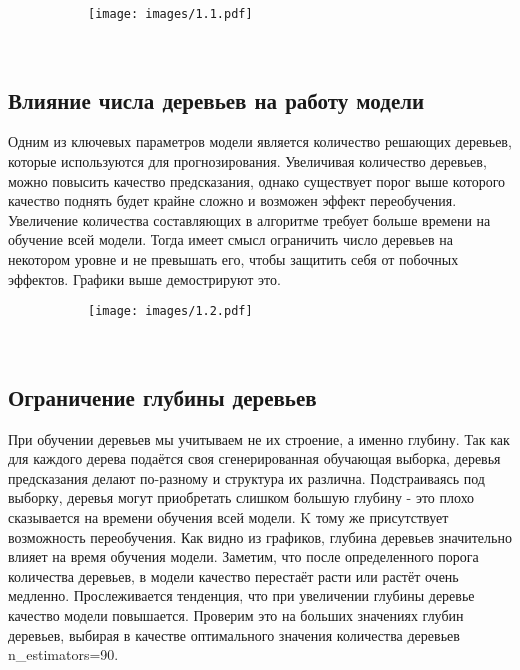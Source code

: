 \documentclass[a4paper,14pt]{article}
\begin{document}
\begin{figure}[h!]
                \centering
                \begin{subfigure}[b]{1.0\textwidth}
                    \texttt{[image: images/1.1.pdf]}
                \end{subfigure}
            \end{figure} \\

\subsection{Влияние числа деревьев на работу модели}
Одним из ключевых параметров модели является количество решающих деревьев, которые используются для прогнозирования. Увеличивая количество деревьев, можно повысить качество предсказания, однако существует порог выше которого качество поднять будет крайне сложно и возможен эффект переобучения. Увеличение количества составляющих в алгоритме требует больше времени на обучение всей модели. Тогда имеет смысл ограничить число деревьев на некотором уровне и не превышать его, чтобы защитить себя от побочных эффектов. Графики выше демострируют это.\\

\begin{figure}[h!]
                \centering
                \begin{subfigure}[b]{1.0\textwidth}
                    \texttt{[image: images/1.2.pdf]}
                \end{subfigure}
            \end{figure} \\
            
\subsection{Ограничение глубины деревьев}
При обучении деревьев мы учитываем не их строение, а именно глубину. Так как для каждого дерева подаётся своя сгенерированная обучающая выборка, деревья предсказания делают по-разному и структура их различна. Подстраиваясь под выборку, деревья могут приобретать слишком большую глубину - это плохо сказывается на времени обучения всей модели. K тому же присутствует возможность переобучения. 
Как видно из графиков, глубина деревьев значительно влияет на время обучения модели. Заметим, что после определенного порога количества деревьев, в модели качество перестаёт расти или растёт очень медленно. 
Прослеживается тенденция, что при увеличении глубины деревье качество модели повышается. Проверим это на больших значениях глубин деревьев, выбирая в качестве оптимального значения количества деревьев n\_estimators=90.\\
\end{document}
